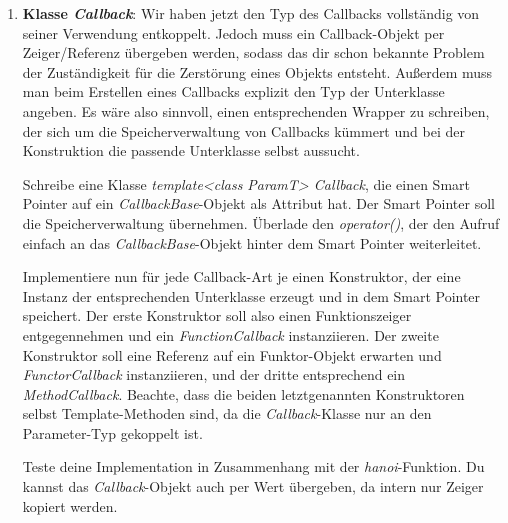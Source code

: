 \begin{enumerate}
\emph{Tipp}: Verwende beispielsweise folgende Signatur für den Konstruktor von \emph{MethodCallback}:
\begin{lstlisting}
MethodCallCallback(void(ClassT::*method)(ParamT), ClassT *object)
\end{lstlisting}

\emph{Tipp 2}: Gegeben einen Zeiger \emph{object} auf ein Objekt, einen Zeiger \emph{method} auf eines seiner Methoden und einen Parameter \emph{p} für die Methode, sieht ein Aufruf von \emph{method} wie folgt aus:
\begin{lstlisting}
	(object->*method)(p);
\end{lstlisting}

\item
\textbf{Klasse \emph{Callback}}:
Wir haben jetzt den Typ des Callbacks vollständig von seiner Verwendung entkoppelt.
Jedoch muss ein Callback-Objekt per Zeiger/Referenz übergeben werden, sodass das dir schon bekannte Problem der Zuständigkeit für die Zerstörung eines Objekts entsteht.
Außerdem muss man beim Erstellen eines Callbacks explizit den Typ der Unterklasse angeben.
Es wäre also sinnvoll, einen entsprechenden Wrapper zu schreiben, der sich um die Speicherverwaltung von Callbacks kümmert und bei der Konstruktion die passende Unterklasse selbst aussucht.

Schreibe eine Klasse \emph{template<class ParamT> Callback}, die einen Smart Pointer auf ein \emph{CallbackBase}-Objekt als Attribut hat. Der Smart Pointer soll die Speicherverwaltung übernehmen. Überlade den \emph{operator()}, der den Aufruf einfach an das \emph{CallbackBase}-Objekt hinter dem Smart Pointer weiterleitet. 

Implementiere nun für jede Callback-Art je einen Konstruktor, der eine Instanz der entsprechenden Unterklasse erzeugt und in dem Smart Pointer speichert.
Der erste Konstruktor soll also einen Funktionszeiger entgegennehmen und ein \emph{FunctionCallback} instanziieren.
Der zweite Konstruktor soll eine Referenz auf ein Funktor-Objekt erwarten und  \emph{FunctorCallback} instanziieren, und der dritte entsprechend ein \emph{MethodCallback}.
Beachte, dass die beiden letztgenannten Konstruktoren selbst Template-Methoden sind, da die \emph{Callback}-Klasse nur an den Parameter-Typ gekoppelt ist.

Teste deine Implementation in Zusammenhang mit der \emph{hanoi}-Funktion. Du kannst das \emph{Callback}-Objekt auch per Wert übergeben, da intern nur Zeiger kopiert werden.

\end{enumerate}


